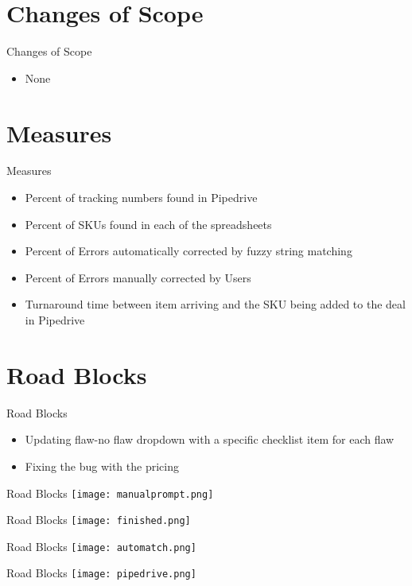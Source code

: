 \documentclass[aspectratio=1610]{beamer}
\begin{document}
\section{Changes of Scope}
\begin{frame}{Changes of Scope}
    \begin{itemize}
        \item None 
    \end{itemize}
\end{frame}
\section{Measures}
\begin{frame}{Measures}
    \begin{itemize}
        \item Percent of tracking numbers found in Pipedrive 
        \item Percent of SKUs found in each of the spreadsheets
        \item Percent of Errors automatically corrected by fuzzy string matching
        \item Percent of Errors manually corrected by Users
        \item Turnaround time between item arriving and the SKU being added to the deal in Pipedrive
    \end{itemize}
\end{frame}
\section{Road Blocks}
\begin{frame}{Road Blocks}
    \begin{itemize}
        \item Updating flaw-no flaw dropdown with a specific checklist item for each flaw
        \item Fixing the bug with the pricing
    \end{itemize}
\end{frame}
\begin{frame}{Road Blocks}
    \texttt{[image: manualprompt.png]}
\end{frame}
\begin{frame}{Road Blocks}
    \texttt{[image: finished.png]}
\end{frame}
\begin{frame}{Road Blocks}
    \texttt{[image: automatch.png]}
\end{frame}
\begin{frame}{Road Blocks}
    \texttt{[image: pipedrive.png]}
\end{frame} 
\end{document}
